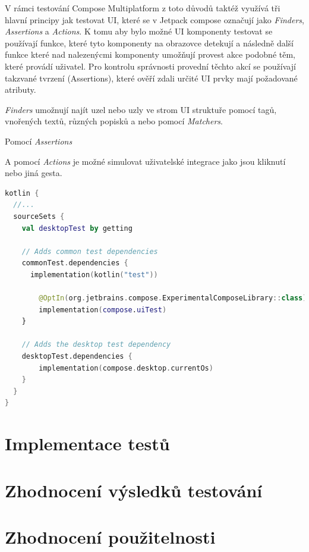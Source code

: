 V rámci testování
Compose Multiplatform z toto důvodů taktéž využívá tři hlavní principy jak testovat UI, které se v Jetpack compose
označují jako \textit{Finders}, \textit{Assertions} a \textit{Actions}. 
K tomu aby bylo možné UI komponenty testovat se používají funkce, které tyto komponenty na obrazovce detekují a následně další funkce které nad nalezenýcmi 
komponenty umožňují provest akce podobné těm, které provádí uživatel. Pro kontrolu správnosti provední těchto akcí se používají takzvané tvrzení 
(Assertions), které ověří zdali určité UI prvky mají požadované atributy.

\textit{Finders} umožnují najít uzel nebo uzly ve strom UI struktuře pomocí tagů, vnořených textů, různých popisků a nebo pomocí \textit{Matchers}.


Pomocí \textit{Assertions}

A pomocí \textit{Actions} je možné simulovat uživatelské integrace jako jsou kliknutí nebo jiná gesta. \cite{composeTesting}


\begin{lstlisting}[caption={Integrace testů Gradle}, label={lst:testsIntegration}, language=Kotlin]
kotlin {  
  //...
  sourceSets {
    val desktopTest by getting

    // Adds common test dependencies
    commonTest.dependencies {
      implementation(kotlin("test"))

        @OptIn(org.jetbrains.compose.ExperimentalComposeLibrary::class)
        implementation(compose.uiTest)
    }

    // Adds the desktop test dependency
    desktopTest.dependencies {
        implementation(compose.desktop.currentOs)
    }
  }
}
\end{lstlisting}

\section{Implementace testů}
\section{Zhodnocení výsledků testování}

\section{Zhodnocení použitelnosti}

